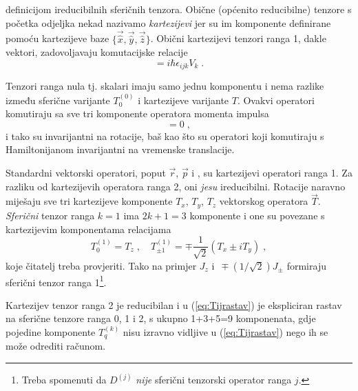 definicijom ireducibilnih sferičnih tenzora. 
Obične (općenito reducibilne) tenzore s početka odjeljka nekad
nazivamo \emph{kartezijevi} jer su im komponente definirane pomoću kartezijeve
baze $\{\vec{\hat{x}}, \vec{\hat{y}}, \vec{\hat{z}}\}$.
Obični kartezijevi tenzori ranga 1, dakle vektori, zadovoljavaju komutacijske
relacije
\begin{equation}
 [J_i, V_j] = i\hbar \epsilon_{ijk} V_k \;.
\end{equation}
\begin{primjer}
Tenzori ranga nula tj. skalari imaju samo jednu komponentu
i nema razlike između sferične varijante $T^{(0)}_0$ i kartezijeve varijante $T$.
Ovakvi operatori komutiraju sa sve tri komponente operatora momenta impulsa
\begin{equation}
    [J_i, T] = 0 \;,
\end{equation}
i tako su invarijantni na rotacije, baš kao što su operatori
koji komutiraju s Hamiltonijanom invarijantni na vremenske translacije.
\end{primjer}
\begin{primjer}
    Standardni vektorski operatori, poput $\vec{r}$, $\vec{p}$ i
    , su kartezijevi operatori ranga 1. Za razliku od
    kartezijevih operatora ranga 2, oni \emph{jesu} ireducibilni.
    Rotacije naravno miješaju sve tri kartezijeve komponente
    $T_x$, $T_y$, $T_z$ vektorskog operatora $\vec{T}$. 
    \emph{Sferični} tenzor ranga $k=1$ ima $2k+1=3$ komponente i
    one su povezane s kartezijevim komponentama relacijama
    \begin{equation}
    T^{(1)}_0 = T_z \;, \quad T^{(1)}_{\pm 1} = \mp \frac{1}{\sqrt{2}}
    (T_x \pm i T_y) \;,
    \label{eq:kartvektor}
    \end{equation}
    koje čitatelj treba provjeriti.
    Tako na primjer $J_z$ i $\,\mp (1/\sqrt{2})J_\pm$ formiraju sferični tenzor 
    ranga 1\footnote{Treba spomenuti da $D^{(j)}$ \emph{nije} 
    sferični tenzorski operator ranga $j$.}.
\end{primjer}
\begin{primjer}
    Kartezijev tenzor ranga 2 je reducibilan i u (\ref{eq:Tijrastav}) je ekspliciran
    rastav na sferične tenzore ranga 0, 1 i 2, s ukupno 1+3+5=9 komponenata,
    gdje pojedine komponente $T^{(k)}_q$ nisu izravno vidljive u (\ref{eq:Tijrastav}) 
    nego ih se može odrediti računom.
\end{primjer}


